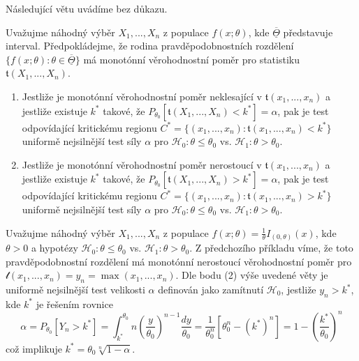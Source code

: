 Následující větu uvádíme bez důkazu.

\begin{theorem}
Uvažujme náhodný výběr $X_1, ..., X_n$ z populace $f(x; \theta)$, kde $\overline{\underline{\Theta}}$ představuje interval. Předpokládejme, že rodina pravděpodobnostních rozdělení $\{f(x;\theta): \theta \in \overline{\underline{\Theta}}\}$ má monotónní věrohodnostní poměr pro statistiku $\mathfrak{t}(X_1, ..., X_n)$.
\begin{enumerate}
\item Jestliže je monotónní věrohodnostní poměr neklesající v $\mathfrak{t}(x_1, ..., x_n)$ a jestliže existuje $k^*$ takové, že $P_{\theta_0}[\mathfrak{t}(X_1, ..., X_n) < k^*] = \alpha$, pak je test odpovídající kritickému regionu $C^* = \{(x_1, ..., x_n): \mathfrak{t}(x_1, ..., x_n) < k^*\}$ uniformě nejsilnější test síly $\alpha$ pro $\mathscr{H}_0: \theta \le \theta_0$ vs. $\mathscr{H}_1: \theta > \theta_0$.
\item Jestliže je monotónní věrohodnostní poměr nerostoucí v $\mathfrak{t}(x_1, ..., x_n)$ a jestliže existuje $k^*$ takové, že $P_{\theta_0}[\mathfrak{t}(X_1, ..., X_n) > k^*] = \alpha$, pak je test odpovídající kritickému regionu $C^* = \{(x_1, ..., x_n): \mathfrak{t}(x_1, ..., x_n) > k^*\}$ uniformě nejsilnější test síly $\alpha$ pro $\mathscr{H}_0: \theta \le \theta_0$ vs. $\mathscr{H}_1: \theta > \theta_0$.
\end{enumerate}
\end{theorem}

\begin{example}
Uvažujme náhodný výběr $X_1, ..., X_n$ z populace $f(x; \theta) = \frac{1}{\theta}I_{(0, \theta)}(x)$, kde $\theta > 0$ a hypotézy $\mathscr{H}_0: \theta \le \theta_0$ vs. $\mathscr{H}_1: \theta > \theta_0$. Z předchozího příkladu víme, že toto pravděpodobnostní rozdělení má monotónní nerostoucí věrohodnostní poměr pro $\mathscr{t}(x_1, ..., x_n) = y_n = \max(x_1, ..., x_n)$. Dle bodu (2) výše uvedené věty je uniformě nejsilnější test velikosti $\alpha$ definován jako zamítnutí $\mathscr{H}_0$, jestliže $y_n > k^*$, kde $k^*$ je řešením rovnice
\begin{equation*}
\alpha = P_{\theta_0}[Y_n > k^*] = \int_{k^*}^{\theta_0}n \left(\frac{y}{\theta_0}\right)^{n - 1} \frac{dy}{\theta_0} = \frac{1}{\theta_0^n}[\theta_0^n - (k^*)^n] = 1 - \left(\frac{k^*}{\theta_0}\right)^n
\end{equation*}
což implikuje $k^* = \theta_0 \sqrt[n]{1 - \alpha}$.
\end{example}

